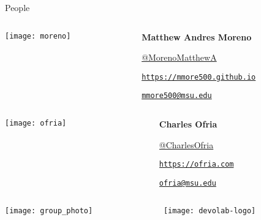 \begin{frame}{People}

\begin{columns}
\begin{column}{0.25\textwidth}
  \centering
  \texttt{[image: moreno]}
\end{column}
\begin{column}{0.75\textwidth}
  \textbf{Matthew Andres Moreno}

  \href{https://twitter.com/MorenoMatthewA}{{\faTwitter} @MorenoMatthewA}

  \href{https://mmore500.github.io}{{\faGlobe} \texttt{https://mmore500.github.io}}

  \href{mailto: mmore500@msu.edu}{{\faEnvelope} \texttt{mmore500@msu.edu}}

\end{column}
\end{columns}

\vspace{1ex}

\begin{columns}
\begin{column}{0.25\textwidth}
  \centering
  \texttt{[image: ofria]}
\end{column}

\begin{column}{0.75\textwidth}
  \textbf{Charles Ofria}

  \href{https://twitter.com/CharlesOfria}{{\faTwitter} @CharlesOfria}

  \href{https://ofria.com}{{\faGlobe} \texttt{https://ofria.com}}

  \href{mailto: ofria@msu.edu}{{\faEnvelope} \texttt{ofria@msu.edu}}

\end{column}
\end{columns}
\vfill
\begin{columns}
\begin{column}{0.5\textwidth}
\texttt{[image: group\_photo]}
\end{column}
\begin{column}{0.5\textwidth}
\texttt{[image: devolab-logo]}
\end{column}
\end{columns}

\end{frame}

